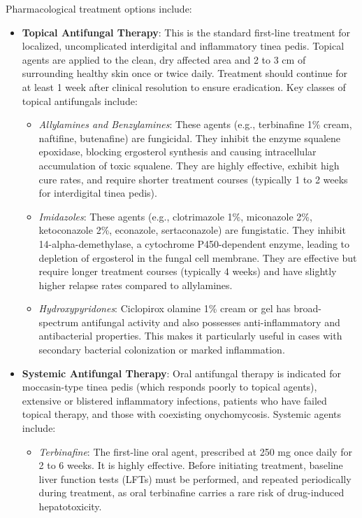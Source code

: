 Pharmacological treatment options include:
\begin{itemize}
    \item \textbf{Topical Antifungal Therapy}: This is the standard first-line treatment for localized, uncomplicated interdigital and inflammatory tinea pedis. Topical agents are applied to the clean, dry affected area and 2 to 3 cm of surrounding healthy skin once or twice daily. Treatment should continue for at least 1 week after clinical resolution to ensure eradication. Key classes of topical antifungals include:
    \begin{itemize}
        \item \textit{Allylamines and Benzylamines}: These agents (e.g., terbinafine 1\% cream, naftifine, butenafine) are fungicidal. They inhibit the enzyme squalene epoxidase, blocking ergosterol synthesis and causing intracellular accumulation of toxic squalene. They are highly effective, exhibit high cure rates, and require shorter treatment courses (typically 1 to 2 weeks for interdigital tinea pedis).
        \item \textit{Imidazoles}: These agents (e.g., clotrimazole 1\%, miconazole 2\%, ketoconazole 2\%, econazole, sertaconazole) are fungistatic. They inhibit 14-alpha-demethylase, a cytochrome P450-dependent enzyme, leading to depletion of ergosterol in the fungal cell membrane. They are effective but require longer treatment courses (typically 4 weeks) and have slightly higher relapse rates compared to allylamines.
        \item \textit{Hydroxypyridones}: Ciclopirox olamine 1\% cream or gel has broad-spectrum antifungal activity and also possesses anti-inflammatory and antibacterial properties. This makes it particularly useful in cases with secondary bacterial colonization or marked inflammation.
    \end{itemize}
    \item \textbf{Systemic Antifungal Therapy}: Oral antifungal therapy is indicated for moccasin-type tinea pedis (which responds poorly to topical agents), extensive or blistered inflammatory infections, patients who have failed topical therapy, and those with coexisting onychomycosis. Systemic agents include:
    \begin{itemize}
        \item \textit{Terbinafine}: The first-line oral agent, prescribed at 250 mg once daily for 2 to 6 weeks. It is highly effective. Before initiating treatment, baseline liver function tests (LFTs) must be performed, and repeated periodically during treatment, as oral terbinafine carries a rare risk of drug-induced hepatotoxicity.

\end{itemize}
\end{itemize}
